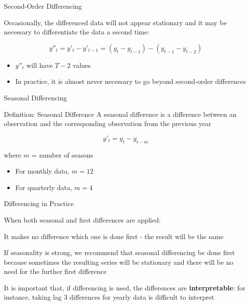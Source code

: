 \documentclass{beamer}
\newenvironment{wideitemize}{\itemize\addtolength{\itemsep}{10pt}}{\enditemize}
\begin{document}
\begin{frame}{Second-Order Differencing}

  Occasionally, the differenced data will not appear stationary and it may be necessary to differentiate the data a second time:\\

  \medskip
  
  \begin{equation*}
    y''_{t} = y'_t - y'_{t-1} = (y_t - y_{t-1}) - (y_{t-1} - y_{t-2})
  \end{equation*}

  \medskip

  \begin{itemize}
  \item $y''_{t}$ will have $T-2$ values
  \item In practice, it is almost never necessary to go beyond second-order differences
  \end{itemize}
  
\end{frame}


\begin{frame}{Seasonal Differencing}

  \begin{block}{Definition: Seasonal Difference}
    A seasonal difference is a difference between an observation and the corresponding observation from the previous year

    \begin{equation*}
      y'_t = y_t - y_{t-m}
    \end{equation*}

    where $m$ = number of seasons


    \begin{itemize}
    \item For monthly data, $m = 12$
    \item For quarterly data, $m = 4$      
    \end{itemize}
    
  \end{block}
\end{frame}


\begin{frame}{Differencing in Practice}

  When both seasonal and first differences are applied:

  \begin{wideitemize}
    \item It makes no difference which one is done first - the result will be the same
    \item If seasonality is strong, we recommend that seasonal differencing be done first because sometimes the resulting series will be stationary and there will be no need for the further first difference
    \item It is important that, if differencing is used, the differences are \textbf{interpretable}: for instance, taking lag 3 differences for yearly data is difficult to interpret
  \end{wideitemize}
\end{frame}
\end{document}
